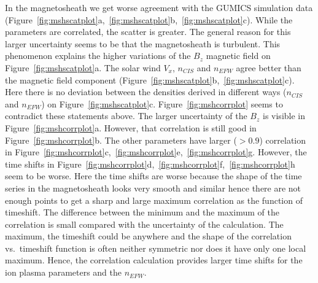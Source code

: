 \documentclass[linenumbers,draft]{agujournal}
\begin{document}
In the magnetosheath we get worse agreement with the GUMICS simulation data (Figure~\ref{fig:mshscatplot}a,~\ref{fig:mshscatplot}b,~\ref{fig:mshscatplot}c). While the parameters are correlated, the scatter is greater. The general reason for this larger uncertainty seems to be that the magnetosheath is turbulent. This phenomenon explains the higher variations of the $B_{z}$ magnetic field on Figure~\ref{fig:mshscatplot}a. The solar wind $V_{x}$, $n_{CIS}$ and $n_{EFW}$ agree better than the magnetic field component (Figure~\ref{fig:mshscatplot}b,~\ref{fig:mshscatplot}c). Here there is no deviation between the densities derived in different ways ($n_{CIS}$ and $n_{EFW}$) on Figure~\ref{fig:mshscatplot}c. Figure~\ref{fig:mshcorrplot} seems to contradict these statements above. The larger uncertainty of the $B_{z}$ is visible in Figure~\ref{fig:mshcorrplot}a. However, that correlation is still good in Figure~\ref{fig:mshcorrplot}b. The other parameters have larger ($>0.9$) correlation in Figure~\ref{fig:mshcorrplot}c,~\ref{fig:mshcorrplot}e,~\ref{fig:mshcorrplot}g. However, the time shifts in Figure~\ref{fig:mshcorrplot}d,~\ref{fig:mshcorrplot}f,~\ref{fig:mshcorrplot}h seem to be worse. Here the time shifts are worse because the shape of the time series in the magnetosheath looks very smooth and similar hence there are not enough points to get a sharp and large maximum correlation as the function of timeshift. The difference between the minimum and the maximum of the correlation is small compared with the uncertainty of the calculation. The maximum, the timeshift could be anywhere and the shape of the correlation vs.~timeshift function is often neither symmetric nor does it have only one local maximum. Hence, the correlation calculation provides larger time shifts for the ion plasma parameters and the $n_{EFW}$. 
\end{document}
